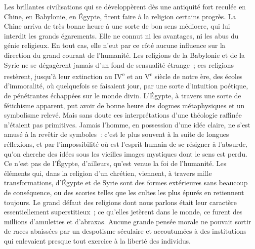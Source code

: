 \documentclass[french,twoside]{book} %
\begin{document}
Les brillantes civilisations qui se développèrent dès une antiquité fort reculée en Chine, en Babylonie, en Égypte, firent faire à la religion certains progrès. La Chine arriva de très bonne heure à une sorte de bon sens médiocre, qui lui interdit les grands égarements. Elle ne connut ni les avantages, ni les abus du génie religieux. En tout cas, elle n’eut par ce côté aucune influence sur la direction du grand courant de l’humanité. Les religions de la Babylonie et de la Syrie ne se dégagèrent jamais d’un fond de sensualité étrange ; ces religions restèrent, jusqu’à leur extinction au IV\textsuperscript{e} et au V\textsuperscript{e} siècle de notre ère, des écoles d’immoralité, où quelquefois se faisaient jour, par une sorte d’intuition poétique, de pénétrantes échappées sur le monde divin. L’Égypte, à travers une sorte de fétichisme apparent, put avoir de bonne heure des dogmes métaphysiques et un symbolisme relevé. Mais sans doute ces interprétations d’une théologie raffinée n’étaient pas primitives. Jamais l’homme, en possession d’une idée claire, ne s’est amusé à la revêtir de symboles : c’est le plus souvent à la suite de longues réflexions, et par l’impossibilité où est l’esprit humain de se résigner à l’absurde, qu’on cherche des idées sous les vieilles images mystiques dont le sens est perdu. Ce n’est pas de l’Égypte, d’ailleurs, qu’est venue la foi de l’humanité. Les éléments qui, dans la religion d’un chrétien, viennent, à travers mille transformations, d’Égypte et de Syrie sont des formes extérieures sans beaucoup de conséquence, ou des scories telles que les cultes les plus épurés en retiennent toujours. Le grand défaut des religions dont nous parlons était leur caractère essentiellement superstitieux ; ce qu’elles jetèrent dans le monde, ce furent des millions d’amulettes et d’abraxas. Aucune grande pensée morale ne pouvait sortir de races abaissées par un despotisme séculaire et accoutumées à des institutions qui enlevaient presque tout exercice à la liberté des individus.\par
\end{document}
